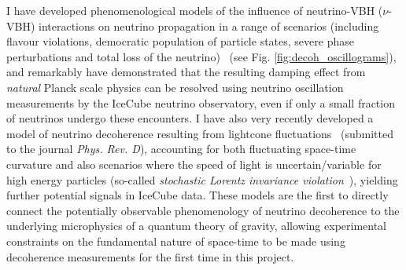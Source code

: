 \documentclass[a4paper,11pt]{article}
\begin{document}
I have developed phenomenological models of the influence of neutrino-VBH ($\nu$-VBH) interactions on neutrino propagation in a range of scenarios (including flavour violations, democratic population of particle states, severe phase perturbations and total loss of the neutrino)~\cite{PhysRevD.102.115003} (see Fig. \ref{fig:decoh_oscillograms}), and remarkably have demonstrated that the resulting damping effect from \textit{natural} Planck scale physics can be resolved using neutrino oscillation measurements by the IceCube neutrino observatory, even if only a small fraction of neutrinos undergo these encounters. I have also very recently developed a model of neutrino decoherence resulting from lightcone fluctuations~\cite{2103.15313} (submitted to the journal \textit{Phys. Rev. D}), accounting for both fluctuating space-time curvature and also scenarios where the speed of light is uncertain/variable for high energy particles (so-called \textit{stochastic Lorentz invariance violation}~\cite{Vasileiou2015, Amelino-Camelia:2016fuh}), yielding further potential signals in IceCube data. These models are the first to directly connect the potentially observable phenomenology of neutrino decoherence to the underlying microphysics of a quantum theory of gravity, allowing experimental constraints on the fundamental nature of space-time to be made using decoherence measurements for the first time in this project.
\end{document}
